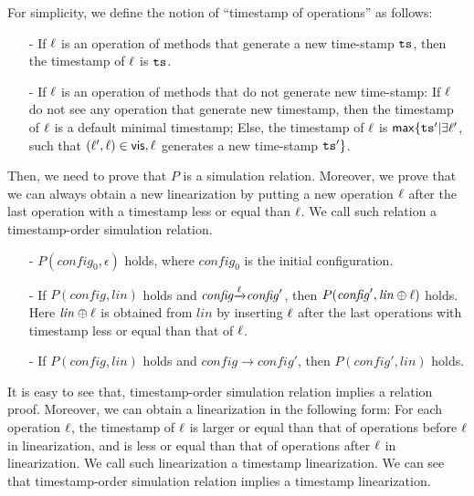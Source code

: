 For simplicity, we define the notion of ``timestamp of operations'' as follows:

\begin{itemize}
\setlength{\itemsep}{0.5pt}
\item[-] If $\ell$ is an operation of methods that generate a new time-stamp $\mathtt{ts}$, then the timestamp of $\ell$ is $\mathtt{ts}$.

\item[-] If $\ell$ is an operation of methods that do not generate new time-stamp: If $\ell$ do not see any operation that generate new timestamp, then the timestamp of $\ell$ is a default minimal timestamp; Else, the timestamp of $\ell$ is $\mathsf{max} \{ \mathtt{ts}' \vert \exists \ell'$, such that $(\ell',\ell) \in \mathsf{vis}, \ell$ generates a new time-stamp $\mathtt{ts}' \}$.
\end{itemize}

Then, we need to prove that $P$ is a simulation relation. Moreover, we prove that we can always obtain a new linearization by putting a new operation $\ell$ after the last operation with a timestamp less or equal than $\ell$. We call such relation a timestamp-order simulation relation.

\begin{itemize}
\setlength{\itemsep}{0.5pt}
\item[-] $P(\mathit{config}_0,\epsilon)$ holds, where $\mathit{config}_0$ is the initial configuration.

\item[-] If $P(\mathit{config},\mathit{lin})$ holds and $\mathit{config} {\xrightarrow{\ell}} \mathit{config}'$, then $P(\mathit{config}', \mathit{lin} \oplus \ell)$ holds. Here  $\mathit{lin} \oplus \ell$ is obtained from $\mathit{lin}$ by inserting $\ell$ after the last operations with timestamp less or equal than that of $\ell$.

\item[-] If $P(\mathit{config},\mathit{lin})$ holds and $\mathit{config} {\xrightarrow{}} \mathit{config}'$, then $P(\mathit{config}',\mathit{lin})$ holds.
\end{itemize}

It is easy to see that, timestamp-order simulation relation implies a \crdtlinearizable{} relation proof. Moreover, we can obtain a linearization in the following form: For each operation $\ell$, the timestamp of $\ell$ is larger or equal than that of operations before $\ell$ in linearization, and is less or equal than that of operations after $\ell$ in linearization. We call such linearization a timestamp linearization. We can see that timestamp-order simulation relation implies a timestamp linearization.

